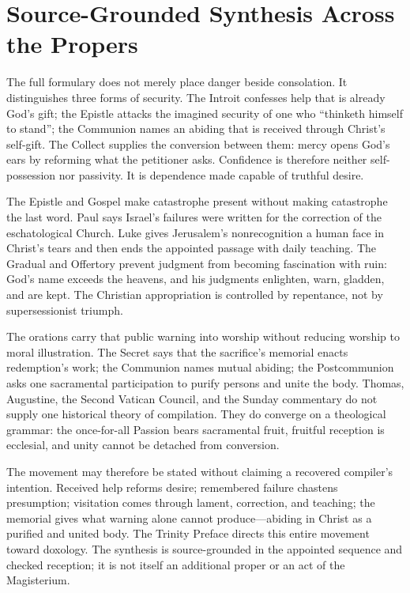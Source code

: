 \sectionguard
\label{triptych:brief-synthesis:next}
\section*{Source-Grounded Synthesis Across the Propers}

The full formulary does not merely place danger beside consolation. It
distinguishes three forms of security. The Introit confesses help that is
already God's gift; the Epistle attacks the imagined security of one who
``thinketh himself to stand''; the Communion names an abiding that is received
through Christ's self-gift. The Collect supplies the conversion between them:
mercy opens God's ears by reforming what the petitioner asks. Confidence is
therefore neither self-possession nor passivity. It is dependence made capable
of truthful desire.

The Epistle and Gospel make catastrophe present without making catastrophe the
last word. Paul says Israel's failures were written for the correction of the
eschatological Church. Luke gives Jerusalem's nonrecognition a human face in
Christ's tears and then ends the appointed passage with daily teaching. The
Gradual and Offertory prevent judgment from becoming fascination with ruin:
God's name exceeds the heavens, and his judgments enlighten, warn, gladden, and
are kept. The Christian appropriation is controlled by repentance, not by
supersessionist triumph.

The orations carry that public warning into worship without reducing worship
to moral illustration. The Secret says that the sacrifice's memorial enacts
redemption's work; the Communion names mutual abiding; the Postcommunion asks
one sacramental participation to purify persons and unite the body. Thomas,
Augustine, the Second Vatican Council, and the Sunday commentary do not supply
one historical theory of compilation. They do converge on a theological
grammar: the once-for-all Passion bears sacramental fruit, fruitful reception
is ecclesial, and unity cannot be detached from conversion.

The movement may therefore be stated without claiming a recovered compiler's
intention. Received help reforms desire; remembered failure chastens
presumption; visitation comes through lament, correction, and teaching; the
memorial gives what warning alone cannot produce—abiding in Christ as a
purified and united body. The Trinity Preface directs this entire movement
toward doxology. The synthesis is source-grounded in the appointed sequence
and checked reception; it is not itself an additional proper or an act of the
Magisterium.
